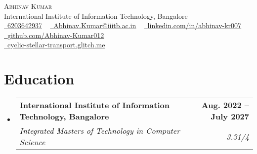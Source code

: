 \documentclass[letterpaper,11pt]{article}
\makeatletter
\newcommand{\resumeSubheading}[4]{
  \vspace{-2pt}\item
    \begin{tabular*}{1.0\textwidth}[t]{l@{\extracolsep{\fill}}r}
      \textbf{#1} & \textbf{\small #2} \\
      \textit{\small#3} & \textit{\small #4} \\
    \end{tabular*}\vspace{-7pt}
}
\newcommand{\resumeSubHeadingListStart}{\begin{itemize}[leftmargin=0.0in, label={}]}
\newcommand{\resumeSubHeadingListEnd}{\end{itemize}}
\makeatother
\begin{document}

\begin{center}
    {\Huge \scshape Abhinav Kumar} \\ \vspace{1pt}
    International Institute of Information Technology, Bangalore \\ \vspace{1pt}
    \small \href{tel:+916203642937}{\raisebox{-0.1\height}\faPhone\ 6203642937} ~ 
    \href{mailto:Abhinav.Kumar@iiitb.ac.in}{\raisebox{-0.2\height}\faEnvelope\  \underline{Abhinav.Kumar@iiitb.ac.in}} ~
    \href{https://www.linkedin.com/in/abhinav-kr007/}{\raisebox{-0.2\height}\faLinkedin\ \underline{linkedin.com/in/abhinav-kr007}} ~ 
    \href{https://github.com/Abhinav-Kumar012}{\raisebox{-0.2\height}\faGithub\ \underline{github.com/Abhinav-Kumar012}} \\
    \href{https://cyclic-stellar-transport.glitch.me/}{\raisebox{-0.2\height}\faGlobe\ \underline{cyclic-stellar-transport.glitch.me}}
    \vspace{-8pt}
\end{center}


\section{Education}
  \resumeSubHeadingListStart
    \resumeSubheading
      {International Institute of Information Technology, Bangalore}{Aug. 2022 -- July 2027}
      {Integrated Masters of Technology in Computer Science}{3.31/4}
  \resumeSubHeadingListEnd



\end{document}
